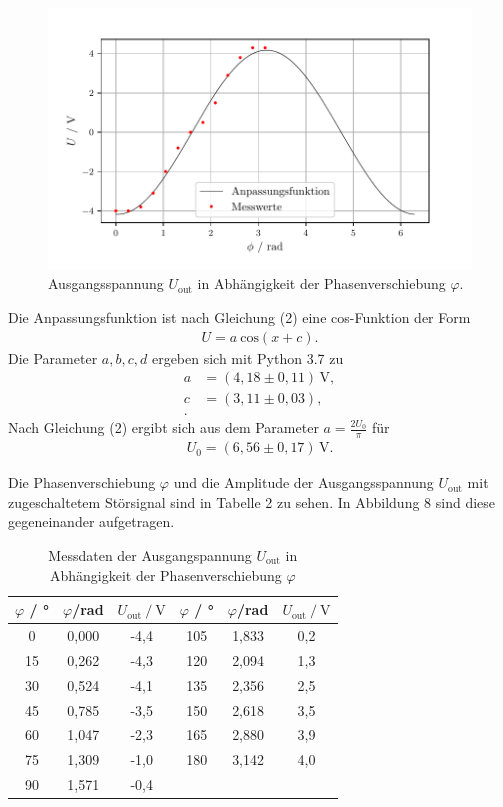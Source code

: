 \begin{figure}[H]
  \centering
  \includegraphics{plot1.pdf}
  \caption{Ausgangsspannung $U_\text{out}$ in Abhängigkeit der Phasenverschiebung $\varphi$.}
\end{figure}

Die Anpassungsfunktion ist nach Gleichung (2) eine cos-Funktion der Form
\begin{align*}
U = a\:\text{cos} (x + c).
\end{align*}
Die Parameter $a,b,c,d$ ergeben sich mit Python 3.7 zu
\begin{align*}
a &= (4,18 \pm 0,11)\,\si{\volt}, \\
c &= (3,11 \pm 0,03), \\.
\end{align*}
Nach Gleichung (2) ergibt sich aus dem Parameter $a = \frac{2 U_\text{0}}{\pi}$ für
\begin{align*} 
U_\text{0} = (6,56 \pm 0,17)\,\si{\volt}.
\end{align*}

Die Phasenverschiebung $\varphi$ und die Amplitude der Ausgangsspannung $U_\text{out}$ 
mit zugeschaltetem Störsignal
sind in Tabelle 2 zu sehen. In Abbildung 8 sind diese gegeneinander aufgetragen.

\begin{table}[H]
\centering
\caption{Messdaten der Ausgangspannung $U_\text{out}$ in Abhängigkeit der Phasenverschiebung $\varphi$}
\label{tab:data3}
\begin{tabular}{c c c c c c}
\toprule
$\varphi$ \:/\: ° & $\varphi$\:/\:rad  & $U_\text{out} \:/\: \si{\volt}$ & $\varphi$ \:/\: ° & $\varphi$\:/\:rad   & $U_\text{out} \:/\: \si{\volt}$\\
\midrule
0  & 0,000 & -4,4 & 105 & 1,833 & 0,2 \\
15 & 0,262 & -4,3 & 120 & 2,094 & 1,3 \\
30 & 0,524 & -4,1 & 135 & 2,356 & 2,5 \\
45 & 0,785 & -3,5 & 150 & 2,618 & 3,5 \\
60 & 1,047 & -2,3 & 165 & 2,880 & 3,9 \\
75 & 1,309 & -1,0 & 180 & 3,142 & 4,0 \\
90 & 1,571 & -0,4 & & & \\
\bottomrule
\end{tabular}
\end{table}


